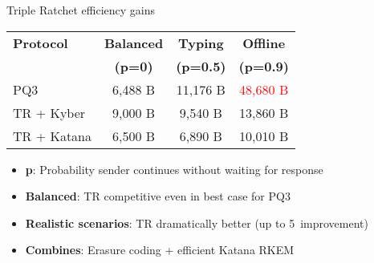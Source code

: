 \documentclass[aspectratio=169, lualatex, handout]{beamer}
\begin{document}
\begin{frame}{Triple Ratchet efficiency gains}
	\begin{center}
		\begin{tabular}{|l|c|c|c|}
			\hline
			\textbf{Protocol} & \textbf{Balanced}                   & \textbf{Typing}                     & \textbf{Offline}                     \\
			                  & \textbf{(p=0)}                      & \textbf{(p=0.5)}                    & \textbf{(p=0.9)}                     \\
			\hline
			PQ3               & 6,488 B                             & 11,176 B                            & \textcolor{red}{48,680 B}            \\
			TR + Kyber        & 9,000 B                             & 9,540 B                             & 13,860 B                             \\
			TR + Katana       & \textcolor{green!70!black}{6,500 B} & \textcolor{green!70!black}{6,890 B} & \textcolor{green!70!black}{10,010 B} \\
			\hline
		\end{tabular}
	\end{center}
	\vspace{3mm}
	\begin{itemize}
		\item \textbf{p}: Probability sender continues without waiting for response
		\item \textbf{Balanced}: TR competitive even in best case for PQ3
		\item \textbf{Realistic scenarios}: TR dramatically better (up to 5\times\ improvement)
		\item \textbf{Combines}: Erasure coding + efficient Katana RKEM
	\end{itemize}
\end{frame}
\end{document}
